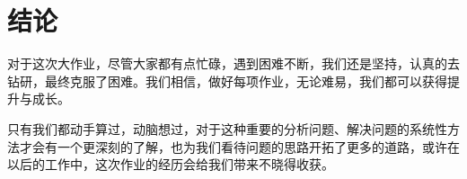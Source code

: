 \clearpage
\section{结论}

对于这次大作业，尽管大家都有点忙碌，遇到困难不断，我们还是坚持，认真的去钻研，最终克服了困难。我们相信，做好每项作业，无论难易，我们都可以获得提升与成长。
 
只有我们都动手算过，动脑想过，对于这种重要的分析问题、解决问题的系统性方法才会有一个更深刻的了解，也为我们看待问题的思路开拓了更多的道路，或许在以后的工作中，这次作业的经历会给我们带来不晓得收获。 